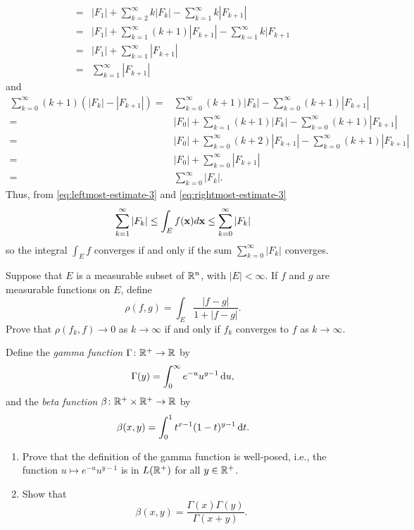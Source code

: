 \begin{solution}
\begin{equation}
\begin{aligned}
={}&|F_1|+\sum_{k=2}^\infty k|F_k|-\sum_{k=1}^\infty k|F_{k+1}|\\
={}&|F_1|+\sum_{k=1}^\infty(k+1)|F_{k+1}|-\sum_{k=1}^\infty k|F_{k+1}\\
={}&|F_1|+\sum_{k=1}^\infty |F_{k+1}|\\
={}&\sum_{k=1}^\infty|F_{k+1}|
\end{aligned}
\end{equation}
and
\begin{equation}
\label{eq:rightmost-estimate-3}
\begin{aligned}
\sum_{k=0}^\infty(k+1)\left(|F_k|-|F_{k+1}|\right)
={}&\sum_{k=0}^\infty(k+1)|F_k|-\sum_{k=0}^\infty(k+1)|F_{k+1}|\\
={}&|F_0|+\sum_{k=1}^\infty(k+1)|F_k|-\sum_{k=0}^\infty(k+1)|F_{k+1}|\\
={}&|F_0|+\sum_{k=0}^\infty(k+2)|F_{k+1}|-\sum_{k=0}^\infty(k+1)|F_{k+1}|\\
={}&|F_0|+\sum_{k=0}^\infty|F_{k+1}|\\
={}&\sum_{k=0}^\infty|F_k|.
\end{aligned}
\end{equation}
Thus, from \eqref{eq:leftmost-estimate-3} and
\eqref{eq:rightmost-estimate-3}
\begin{equation}
\label{eq:final-upper-lower-estimates-3}
\sum_{k=1}^\infty|F_k|\leq\int_E f(\mathbf{x}) d \mathbf{x}\leq\sum_{k=0}^\infty|F_k|
\end{equation}
so the integral $\int_E f$ converges if and only if the sum
$\sum_{k=0}^\infty|F_k|$ converges.
\end{solution}
\begin{problem}
Suppose that $E$ is a measurable subset of $\mathbb{R}^n$, with
$|E|<\infty$. If $f$ and $g$ are measurable functions on
$E$, define
\[
\rho(f,g)=\int_E\frac{|f-g|}{1+|f-g|}.
\]
Prove that $\rho(f_k,f)\to 0$ as $k\to\infty$ if and only if $f_k$
converges to $f$ as $k\to\infty$.
\end{problem}
\begin{solution}
\end{solution}

\begin{problem}
Define the \emph{gamma function} $\Gamma\colon\mathbb{R}^+\to\mathbb{R}$ by
\[
\Gamma(y)=\int_0^\infty e^{-u}u^{y-1}\mathop{}\!\mathrm{d} u,
\]
and the \emph{beta function} $\beta\colon\mathbb{R}^+\times\mathbb{R}^+\to\mathbb{R}$
by
\[
\beta(x,y)=\int_0^1 t^{x-1}(1-t)^{y-1}\mathop{}\!\mathrm{d} t.
\]
\begin{enumerate}[label=(\alph*),noitemsep]
\item Prove that the definition of the gamma function is well-posed, i.e.,
the function $u\mapsto e^{-u}u^{y-1}$ is in $L(\mathbb{R}^+)$ for all
$y\in\mathbb{R}^+$.
\item Show that
\[
\beta(x,y)=\frac{\Gamma(x)\Gamma(y)}{\Gamma(x+y)}.
\]
\end{enumerate}
\end{problem}
\begin{solution}
\end{solution}

